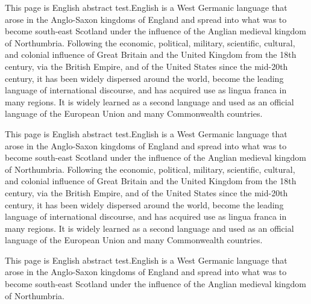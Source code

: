 \begin{englishabstract}
This page is English abstract test.English is a West Germanic language
that arose in the Anglo-Saxon kingdoms of England and spread into what
was to become south-east Scotland under the influence of the Anglian medieval
kingdom of Northumbria. Following the economic, political, military, scientific,
cultural, and colonial influence of Great Britain and the United Kingdom from
the 18th century, via the British Empire, and of the United States since the
mid-20th century, it has been widely dispersed around the world, become the
leading language of international discourse, and has acquired use as lingua
franca in many regions. It is widely learned as a second language and used
as an official language of the European Union and many Commonwealth countries.

This page is English abstract test.English is a West Germanic language
that arose in the Anglo-Saxon kingdoms of England and spread into what
was to become south-east Scotland under the influence of the Anglian medieval
kingdom of Northumbria. Following the economic, political, military, scientific,
cultural, and colonial influence of Great Britain and the United Kingdom from
the 18th century, via the British Empire, and of the United States since the
mid-20th century, it has been widely dispersed around the world, become the
leading language of international discourse, and has acquired use as lingua
franca in many regions. It is widely learned as a second language and used
as an official language of the European Union and many Commonwealth countries.

This page is English abstract test.English is a West Germanic language
that arose in the Anglo-Saxon kingdoms of England and spread into what
was to become south-east Scotland under the influence of the Anglian medieval
kingdom of Northumbria.

\end{englishabstract}

